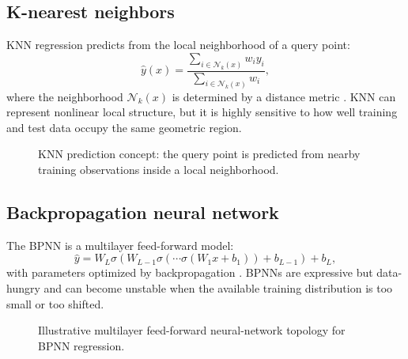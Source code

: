 \documentclass[11pt]{article}
\begin{document}
\subsection{K-nearest neighbors}
KNN regression predicts from the local neighborhood of a query point:
\begin{equation}
\hat{y}(x) = \frac{\sum_{i \in \mathcal{N}_k(x)} w_i y_i}{\sum_{i \in \mathcal{N}_k(x)} w_i},
\end{equation}
where the neighborhood $\mathcal{N}_k(x)$ is determined by a distance metric \cite{aha1991}. KNN can represent nonlinear local structure, but it is highly sensitive to how well training and test data occupy the same geometric region.

\begin{figure}[H]
\centering
{}
\caption{KNN prediction concept: the query point is predicted from nearby training observations inside a local neighborhood.}
\end{figure}

\subsection{Backpropagation neural network}
The BPNN is a multilayer feed-forward model:
\begin{equation}
\hat{y} = W_L \sigma\left(W_{L-1}\sigma\left(\cdots \sigma(W_1 x + b_1)\right)+b_{L-1}\right)+b_L,
\end{equation}
with parameters optimized by backpropagation \cite{rumelhart1986}. BPNNs are expressive but data-hungry and can become unstable when the available training distribution is too small or too shifted.

\begin{figure}[H]
\centering
{}
\caption{Illustrative multilayer feed-forward neural-network topology for BPNN regression.}
\end{figure}
\end{document}
